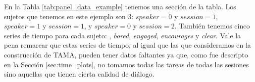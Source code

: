 En la Tabla \ref{tab:panel_data_example} tenemos una sección de la tabla. Los sujetos que tenemos en este ejemplo son 3: $speaker = 0$ y $session=1$, $speaker = 1$ y $session=1$, y $speaker = 0$ y $session=2$. También tenemos cinco series de tiempo para cada sujeto: \entrainment, \emph{bored}, \emph{engaged}, \emph{encourages} y \emph{clear}. Vale la pena remarcar que estas series de tiempo, al igual que las que consideramos en la construcción de TAMA, pueden tener datos faltantes ya que, como fue descripto en la Sección \ref{sec:time_plots}, no tomamos todas las tareas de todas las sesiones sino aquellas que tienen cierta calidad de diálogo.


